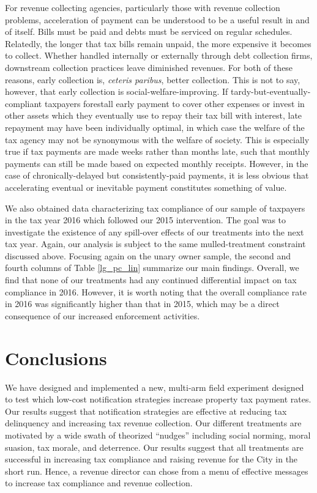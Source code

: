 \documentclass[12pt]{article}
\begin{document}
For revenue collecting agencies, particularly those with revenue
collection problems, acceleration of payment can be understood to be a
useful result in and of itself. Bills must be paid and debts must be
serviced on regular schedules. Relatedly, the longer that tax bills
remain unpaid, the more expensive it becomes to collect. Whether
handled internally or externally through debt collection firms,
downstream collection practices leave diminished revenues. For both of
these reasons, early collection is, \textit{ceteris paribus}, better
collection. This is not to say, however, that early collection is
social-welfare-improving. If tardy-but-eventually-compliant taxpayers
forestall early payment to cover other expenses or invest
in other assets which they eventually use to repay their tax bill with
interest, late repayment may have been individually optimal, 
in which case the welfare of the tax agency may not be synonymous
with the welfare of society. This is especially true if tax payments
are made weeks rather than months late, such that monthly payments can
still be made based on expected monthly receipts. However, in the case
of chronically-delayed but consistently-paid payments, it is less
obvious that accelerating eventual or inevitable payment constitutes
something of value.

We also obtained data characterizing tax compliance of our sample of taxpayers in
the tax year 2016 which followed our 2015 intervention. 
The goal was to investigate the existence of any spill-over effects of
our treatments into the next tax year. Again, our analysis is subject to
the same mulled-treatment constraint discussed above.  Focusing again on the unary
owner sample, the second and fourth columns of Table \ref{lg_pc_lin} summarize our
main findings. Overall, we find that none of our
treatments had any continued differential impact on tax compliance in
2016. However, it is worth noting that the overall compliance rate
in 2016 was significantly higher than that in 2015, which may be a
direct consequence of our increased enforcement activities.
 

\section{Conclusions}


We have designed and implemented a new, multi-arm field experiment
designed to test which low-cost notification strategies increase
property tax payment rates. Our results suggest that notification
strategies are effective at reducing tax delinquency and increasing
tax revenue collection.  Our different treatments are motivated by a
wide swath of theorized ``nudges'' including social norming, moral
suasion, tax morale, and deterrence. Our results suggest that all
treatments are successful in increasing tax compliance and raising
revenue for the City in the short run. Hence, a revenue director can
chose from a menu of effective messages to increase tax compliance and
revenue collection.
\end{document}
